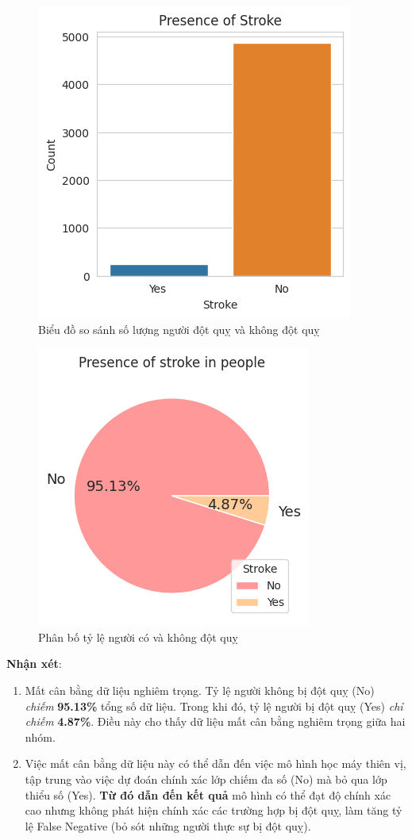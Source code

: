 \documentclass[11pt]{article}
\begin{document}
	\begin{figure}[H]
		\centering
		\includegraphics[width=0.5\linewidth]{dataBalanceCompare}
		\caption{Biểu đồ so sánh số lượng người đột quỵ và không đột quỵ}
		\label{fig:databalancecompare}
	\end{figure}
	
	\begin{figure}[H]
		\centering
		\includegraphics[width=0.5\linewidth]{compareBalancePie}
		\caption{Phân bố tỷ lệ người có và không đột quỵ}
		\label{fig:comparebalancepie}
	\end{figure}
	
	\textbf{Nhận xét}:
	\begin{enumerate}
		\item Mất cân bằng dữ liệu nghiêm trọng. Tỷ lệ người không bị đột quỵ (No) \textit{chiếm} \textbf{95.13\%} tổng số dữ liệu. Trong khi đó, tỷ lệ người bị đột quỵ (Yes) \textit{chỉ chiếm} \textbf{4.87\%}. Điều này cho thấy dữ liệu mất cân bằng nghiêm trọng giữa hai nhóm.
		\item Việc mất cân bằng dữ liệu này có thể dẫn đến việc mô hình học máy thiên vị, tập trung vào việc dự đoán chính xác lớp chiếm đa số (No) mà bỏ qua lớp thiểu số (Yes). \textbf{Từ đó dẫn đến kết quả} mô hình có thể đạt độ chính xác cao nhưng không phát hiện chính xác các trường hợp bị đột quỵ, làm tăng tỷ lệ False Negative (bỏ sót những người thực sự bị đột quỵ).
	\end{enumerate}
	
\end{document}
